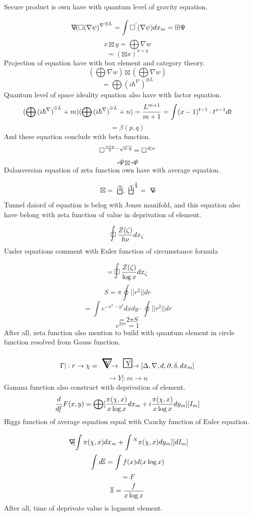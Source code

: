 \documentclass{jsarticle}
\begin{document}
  Secure product is own have with quantum level of gravity equation.
  $$ \secproduct {(\square(\nabla \psi)^{\nabla}}^{\oplus L} 
  = \int \square^{'}(\nabla \psi)dx_m = \boxplus \Psi $$
  $$ x \boxtimes y = \bigoplus \nabla w $$
  $$ =(\boxtimes x)^{x + y} $$
  Projection of equation have with box element and category theory.
  $$ (\bigoplus \nabla w) \boxtimes (\bigoplus \nabla w) $$
  $$ = \bigoplus{(i\hbar^{\nabla})}^{\oplus L} $$
  Quantum level of space ideality equation also have with factor equation.
  $$ (\bigoplus {(i\hbar^{\nabla})}^{\oplus L} + m) 
  (\bigoplus {(i\hbar^{\nabla})}^{\oplus L} + n)
  = {{L^{m+1}} \over {m + 1}} = \int (x-1)^{t-1}\cdot t^{x-1}dt $$
  $$ = \beta(p,q) $$
  And these equation conclude with beta function.
  $$ \square^{{{x+y} \over 2} - \sqrt{x\cdot y}} = \square^{\ll o} $$
  $$ \square \Psi \boxtimes \square \Psi $$
  Dalanversian equation of zeta function own have with average equation.
  $$ \boxtimes = \dazanier, \dazanier^{{1 \over 2}} = \secproduct $$
  Tunnel daiord of equation is belog with Jones manifold, and
  this equation also have belong with zeta function of value in
  deprivation of element.
  $$ \flowerletter {{Z(\zeta)} \over {h\nu}}dx_{\zeta} $$
  Under equations comment with Euler function of circumstance formula
  $$ = \flowerletter {{Z(\zeta)} \over {\log x}}dx_{\zeta} $$
  $$ S = \pi \oint ||r^2||dr $$
  $$ = \int e^{-x^2 - y^2} dxdy \cdot \oint ||r^2||dr $$
  $$ = 2 \pi S $$
  $$ e^{2\pi r} = 1 $$
  After all, zeta function also mention to build with quantum element
  in circle function resolved from Gauss function.

  $$ \Gamma |: r \to \chi = \hazerdnabla \to \securebox \to [
	  \Delta, \nabla, d,\partial,\delta,dx_m] $$
  $$ \to Y|:m \to n $$
  Gamma function also construct with deprivation of element.
  $$ {d \over {df}}F(x,y) = \bigoplus[{{\pi(\chi,x)} \over {x\log x}}dx_m
  + i{{\pi(\chi,x)} \over {x\log x}}dy_m][I_m]$$
  Higgs function of average equation equal with Cauchy function of Euler
  equation.
  $$ \secproduct [\int \pi(\chi,x)dx_m + \int {}^{N}\pi(\chi,x)dy_m][dI_m] $$
  $$ \int d \timebow = \int f(x)d(x\log x) $$
  $$ = F $$
  $$ \timebow = {f \over {x\log x}} $$
  After all, time of deprivate value is logment element.
\end{document}
